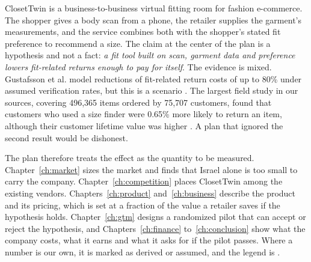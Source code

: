 ClosetTwin is a business-to-business virtual fitting room for fashion e-commerce. The shopper gives a body scan from a phone, the retailer supplies the garment's measurements, and the service combines both with the shopper's stated fit preference to recommend a size. The claim at the center of the plan is a hypothesis and not a fact: \emph{a fit tool built on scan, garment data and preference lowers fit-related returns enough to pay for itself}. The evidence is mixed. Gustafsson et al. model reductions of fit-related return costs of up to 80\% under assumed verification rates, but this is a scenario \cite{gustafsson2021}. The largest field study in our sources, covering 496,365 items ordered by 75,707 customers, found that customers who used a size finder were 0.65\% more likely to return an item, although their customer lifetime value was higher \cite{patel2025}. A plan that ignored the second result would be dishonest.

The plan therefore treats the effect as the quantity to be measured. Chapter~\ref{ch:market} sizes the market and finds that Israel alone is too small to carry the company. Chapter~\ref{ch:competition} places ClosetTwin among the existing vendors. Chapters~\ref{ch:product} and~\ref{ch:business} describe the product and its pricing, which is set at a fraction of the value a retailer saves if the hypothesis holds. Chapter~\ref{ch:gtm} designs a randomized pilot that can accept or reject the hypothesis, and Chapters~\ref{ch:finance} to~\ref{ch:conclusion} show what the company costs, what it earns and what it asks for if the pilot passes. Where a number is our own, it is marked as derived or assumed, and the legend is \ctlegend{}.

\ctchapterend
